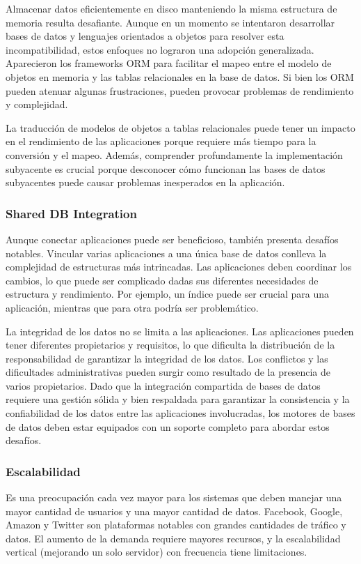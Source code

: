 \documentclass{article}
\begin{document}
		Almacenar datos eficientemente en disco manteniendo la misma estructura de memoria resulta desafiante. Aunque en un momento se intentaron desarrollar bases de datos y lenguajes orientados a objetos para resolver esta incompatibilidad, estos enfoques no lograron una adopción generalizada. Aparecieron los frameworks ORM para facilitar el mapeo entre el modelo de objetos en memoria y las tablas relacionales en la base de datos. Si bien los ORM pueden atenuar algunas frustraciones, pueden provocar problemas de rendimiento y complejidad.
		
		La traducción de modelos de objetos a tablas relacionales puede tener un impacto en el rendimiento de las aplicaciones porque requiere más tiempo para la conversión y el mapeo. Además, comprender profundamente la implementación subyacente es crucial porque desconocer cómo funcionan las bases de datos subyacentes puede causar problemas inesperados en la aplicación.
		
		\subsubsection{Shared DB Integration}
		Aunque conectar aplicaciones puede ser beneficioso, también presenta desafíos notables. Vincular varias aplicaciones a una única base de datos conlleva la complejidad de estructuras más intrincadas. Las aplicaciones deben coordinar los cambios, lo que puede ser complicado dadas sus diferentes necesidades de estructura y rendimiento. Por ejemplo, un índice puede ser crucial para una aplicación, mientras que para otra podría ser problemático.
		
		La integridad de los datos no se limita a las aplicaciones. Las aplicaciones pueden tener diferentes propietarios y requisitos, lo que dificulta la distribución de la responsabilidad de garantizar la integridad de los datos. Los conflictos y las dificultades administrativas pueden surgir como resultado de la presencia de varios propietarios. Dado que la integración compartida de bases de datos requiere una gestión sólida y bien respaldada para garantizar la consistencia y la confiabilidad de los datos entre las aplicaciones involucradas, los motores de bases de datos deben estar equipados con un soporte completo para abordar estos desafíos.
		
				
		\subsubsection{Escalabilidad}\label{sec:escalabilidad_sql}
		Es una preocupación cada vez mayor para los sistemas que deben manejar una mayor cantidad de usuarios y una mayor cantidad de datos. Facebook, Google, Amazon y Twitter son plataformas notables con grandes cantidades de tráfico y datos. El aumento de la demanda requiere mayores recursos, y la escalabilidad vertical (mejorando un solo servidor) con frecuencia tiene limitaciones.
		
\end{document}
